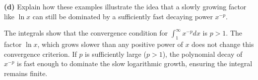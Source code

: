 \textbf{(d)} Explain how these examples illustrate the idea that a slowly growing factor like $\ln x$ can still be dominated by a sufficiently fast decaying power $x^{-p}$.

The integrals show that the convergence condition for $\int_{1}^{\infty} x^{-p} dx$ is $p > 1$. The factor $\ln x$, which grows slower than any positive power of $x$ does not change this convergence criterion. If $p$ is sufficiently large ($p > 1$), the polynomial decay of $x^{-p}$ is fast enough to dominate the slow logarithmic growth, ensuring the integral remains finite.
\pagebreak
